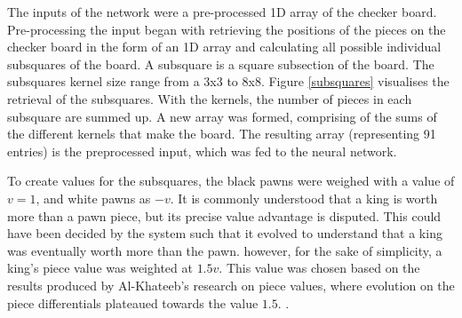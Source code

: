 \documentclass[12pt,a4paper]{article}
\begin{document}
\begin{figure}[ht!]
        \end{figure}
        

        The inputs of the network were a pre-processed 1D array of the checker board. Pre-processing the input began with retrieving the positions of the pieces on the checker board in the form of an 1D array and calculating all possible individual subsquares of the board. A subsquare is a square subsection of the board. The subsquares kernel size range from a 3x3 to 8x8. Figure \ref{subsquares} visualises the retrieval of the subsquares. With the kernels, the number of pieces in each subsquare are summed up. A new array was formed, comprising of the sums of the different kernels that make the board. The resulting array (representing 91 entries) is the preprocessed input, which was fed to the neural network.
        
        To create values for the subsquares, the black pawns were weighed with a value of $v=1$, and white pawns as $-v$. It is commonly understood that a king is worth more than a pawn piece, but its precise value advantage is disputed. This could have been decided by the system such that it evolved to understand that a king was eventually worth more than the pawn. however, for the sake of simplicity, a king's piece value was weighted at $1.5v$. This value was chosen based on the results produced by Al-Khateeb's research on piece values, where evolution on the piece differentials plateaued towards the value $1.5$. \cite{al-khateeb_importance_2010}.
\end{document}
